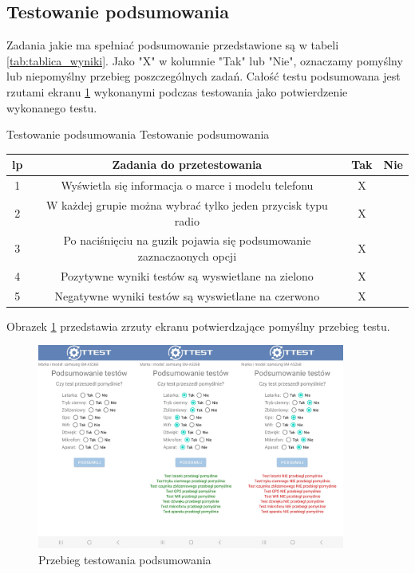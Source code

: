 \newpage


\subsection{Testowanie podsumowania}

Zadania jakie ma spełniać podsumowanie przedstawione są w tabeli \ref{tab:tablica_wyniki}. Jako "X" w kolumnie "Tak" lub "Nie", oznaczamy pomyślny lub niepomyślny przebieg poszczególnych zadań. Całość testu podsumowana jest rzutami ekranu \ref{rys:wyniki} wykonanymi podczas testowania jako potwierdzenie wykonanego testu.

\begin{tabela}
	{Testowanie podsumowania}	%
	{Testowanie podsumowania}	%
	{
		\begin{tabular}{|c|c|c|c|} \hline
			\textbf{lp} & \textbf{Zadania do przetestowania} & \textbf{Tak} & \textbf{Nie} \\ \hline
			1 & Wyświetla się informacja o marce i modelu telefonu & X & ~ \\ \hline
			2 & W każdej grupie można wybrać tylko jeden przycisk typu radio & X & ~ \\ \hline
			3 & Po naciśnięciu na guzik pojawia się podsumowanie zaznaczaonych opcji & X & ~ \\ \hline
			4 & Pozytywne wyniki testów są wyswietlane na zielono & X & ~ \\ \hline
			5 & Negatywne wyniki testów są wyswietlane na czerwono & X & ~ \\ \hline
	\end{tabular}	}
	\label{tab:tablica_wyniki}
\end{tabela}

Obrazek \ref{rys:wyniki} przedstawia zrzuty ekranu potwierdzające pomyślny przebieg testu.

\begin{figure}[!hbt]
	\begin{center}
		\includegraphics[angle=360, width=0.90\textwidth]{rys/punkt5/wyniki.png}
		\caption{Przebieg testowania podsumowania}
		\label{rys:wyniki}
	\end{center}
\end{figure}   

\newpage

